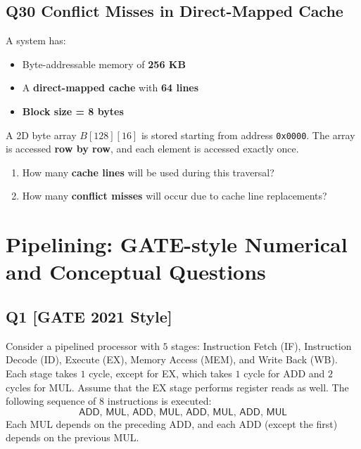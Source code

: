 \vspace{1em}
\newpage
\subsection*{Q30 Conflict Misses in Direct-Mapped Cache}
A system has:
\begin{itemize}
    \item Byte-addressable memory of \textbf{256 KB}
    \item A \textbf{direct-mapped cache} with \textbf{64 lines}
    \item \textbf{Block size = 8 bytes}
\end{itemize}
A 2D byte array $B[128][16]$ is stored starting from address \texttt{0x0000}. The array is accessed \textbf{row by row}, and each element is accessed exactly once.


\begin{enumerate}[label=\textbf{Q3.\arabic*.}]
    \item How many \textbf{cache lines} will be used during this traversal?
    \item How many \textbf{conflict misses} will occur due to cache line replacements?
\end{enumerate}



\section{Pipelining: GATE-style Numerical and Conceptual Questions}

\subsection*{Q1 [GATE 2021 Style]}
Consider a pipelined processor with $5$ stages: Instruction Fetch (\textsf{IF}), Instruction Decode (\textsf{ID}), Execute (\textsf{EX}), Memory Access (\textsf{MEM}), and Write Back (\textsf{WB}). Each stage takes $1$ cycle, except for \textsf{EX}, which takes $1$ cycle for \textsf{ADD} and $2$ cycles for \textsf{MUL}. Assume that the \textsf{EX} stage performs register reads as well. The following sequence of $8$ instructions is executed:
\[
\textsf{ADD, MUL, ADD, MUL, ADD, MUL, ADD, MUL}
\]
Each \textsf{MUL} depends on the preceding \textsf{ADD}, and each \textsf{ADD} (except the first) depends on the previous \textsf{MUL}. 

